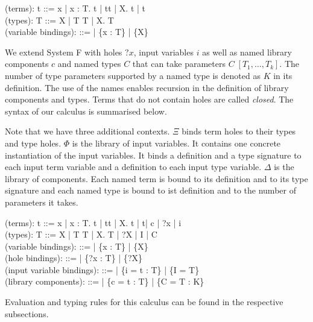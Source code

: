  \begin{plstx}
(terms): t ::= x | \lambda x : T.\; t | t\;t | \Lambda X.\; t | t\;[T]\\
(types): T ::= X | T \rightarrow T | \forall X.\; T\\
(variable bindings): \Gamma ::= \emptyset | \Gamma \cup \{x : T\} | \Gamma \cup \{X\}\\
\end{plstx}


We extend System F with holes $?x$, input variables $i$ as well as named library components $c$ and named types $C$ that can take parameters $C\;[T_1, \ldots, T_k]$. The number of type parameters supported by a named type is denoted as $K$ in its definition. The use of the names enables recursion in the definition of library components and types. Terms that do not contain holes are called \emph{closed}.
The syntax of our calculus is summarised below.

Note that we have three additional contexts. $\Xi$ binds term holes to their types and type holes.
$\Phi$ is the library of input variables. It contains one concrete instantiation of the input variables. It binds a definition and a type signature to each input term variable and a definition to each input type variable.
$\Delta$ is the library of components. Each named term is bound to its definition and to its type signature and each named type is bound to ist definition and to the number of parameters it takes.
 \begin{plstx}
(terms): t ::= x | \lambda x : T.\; t | t\;t | \Lambda X.\; t | t\;[T] | c | {?x} | i\\
(types): T ::= X | T \rightarrow T | \forall X.\; T | ?X | I | C\;[T,\ldots, T]\\
(variable bindings): \Gamma ::= \emptyset | \Gamma \cup \{x : T\} | \Gamma \cup \{X\}\\
(hole bindings): \Xi ::= \emptyset | \Xi \cup \{{?x} : T\} | \Xi \cup \{{?X}\}\\
(input variable bindings): \Phi ::= \emptyset | \Phi \cup \{i = t : T\} | \Phi \cup \{I = T\}\\
(library components): \Delta ::= \emptyset | \Delta \cup \{c = t : T\} | \Delta \cup \{C = T : K\}\\
\end{plstx}
Evaluation and typing rules for this calculus can be found in the respective subsections.

